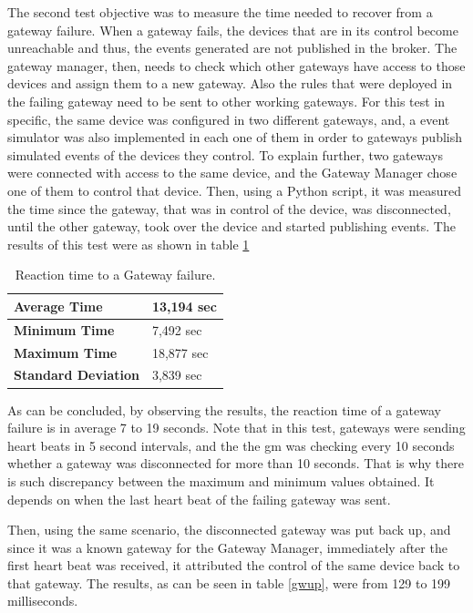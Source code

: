 The second test objective was to measure the time needed to recover from a gateway failure. When a gateway fails, the devices that are in its control become unreachable and thus, the events generated are not published in the broker. The gateway manager, then, needs to check which other gateways have access to those devices and assign them to a new gateway. Also the rules that were deployed in the failing gateway need to be sent to other working gateways. For this test in specific, the same device was configured in two different gateways, and, a event simulator was also implemented in each one of them in order to gateways publish simulated events of the devices they control. To explain further, two gateways were connected with access to the same device, and the Gateway Manager chose one of them to control that device. Then, using a Python script, it was measured the time since the gateway, that was in control of the device, was disconnected, until the other gateway, took over the device and started publishing events. The results of this test were as shown in table \ref{gwdown}

 
\begin{table}[H]

	\begin{tabular}{|l|l|}
		\hline
		\textbf{Average Time}       & 13,194 sec \\ \hline
		\textbf{Minimum Time}       & 7,492 sec \\ \hline
		\textbf{Maximum Time}       & 18,877 sec \\ \hline
		\textbf{Standard Deviation} & 3,839 sec \\ \hline
	\end{tabular}
	\centering
	\caption{Reaction time to a Gateway failure.}
	\label{gwdown}
\end{table}

As can be concluded, by observing the results, the reaction time of a gateway failure is in average 7 to 19 seconds. Note that in this test, gateways were sending heart beats in 5 second intervals, and the the \ac{gm} was checking every 10 seconds whether a gateway was disconnected for more than 10 seconds. That is why there is such discrepancy between the maximum and minimum values obtained. It depends on when the last heart beat of the failing gateway was sent.

Then, using the same scenario, the disconnected gateway was put back up, and since it was a known gateway for the Gateway Manager, immediately after the first heart beat was received, it attributed the control of the same device back to that gateway. The results, as can be seen in table \ref{gwup}, were from 129 to 199 milliseconds.

